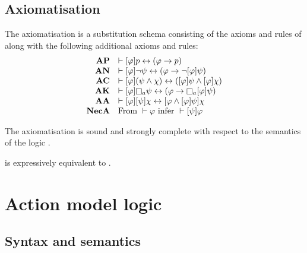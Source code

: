 \subsection{Axiomatisation}

\begin{definition}
The axiomatisation \axiomPalS{} is a substitution schema consisting of the axioms and rules of \axiomS{} along with the following additional axioms and rules:
$$
\begin{array}{rl}
    {\bf AP} & \proves \announceA{\phi} \atomP \iff (\phi \implies \atomP)\\
    {\bf AN} & \proves \announceA{\phi} \lnot \psi \iff (\phi \implies \lnot \announceA{\phi} \psi)\\
    {\bf AC} & \proves \announceA{\phi} (\psi \land \chi) \iff (\announceA{\phi} \psi \land \announceA{\phi} \chi)\\
    {\bf AK} & \proves \announceA{\phi} \necessary[\agentA] \psi \iff (\phi \implies \necessary[\agentA] \announceA{\phi} \psi)\\
    {\bf AA} & \proves \announceA{\phi} \announceA{\psi} \chi \iff \announceA{\phi \land \announceA{\phi} \psi} \chi\\
    {\bf NecA} & \text{From } \proves \phi \text{ infer } \proves \announceA{\psi} \phi
\end{array}
$$
\end{definition}

\begin{proposition}
The axiomatisation \axiomPalS{} is sound and strongly complete with respect to the semantics of the logic \logicPalS{}.
\end{proposition}

\begin{proposition}
\logicPalS{} is expressively equivalent to \logicS{}.
\end{proposition}

\section{Action model logic}

\subsection{Syntax and semantics}

